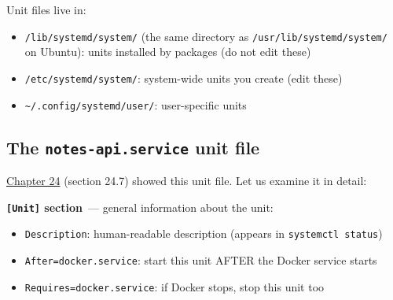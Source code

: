 \noindent{}Unit files live in:

\begin{itemize}
\tightlist
\item
  \texttt{/}\allowbreak{}\texttt{lib/}\allowbreak{}\texttt{systemd/}\allowbreak{}\texttt{system/} (the same directory as \texttt{/}\allowbreak{}\texttt{usr/}\allowbreak{}\texttt{lib/}\allowbreak{}\texttt{systemd/}\allowbreak{}\texttt{system/} on Ubuntu): units installed by packages (do not edit these)
\item
  \texttt{/}\allowbreak{}\texttt{etc/}\allowbreak{}\texttt{systemd/}\allowbreak{}\texttt{system/}: system-wide units you create (edit these)
\item
  \texttt{\textasciitilde{}/}\allowbreak{}\texttt{.config/}\allowbreak{}\texttt{systemd/}\allowbreak{}\texttt{user/}: user-specific units
\end{itemize}

\subsection*{\texorpdfstring{The \texttt{notes-api.service} unit file}{The notes-api.service unit file}}\label{25-process-management:the-notes-apiservice-unit-file}

\hyperref[ch:24-process-startup]{Chapter 24} (section 24.7) showed this unit file. Let us examine it in detail:

\begin{codebox}[short]

\begin{Shaded}
\begin{Highlighting}[]
\KeywordTok{[Unit]}
\OtherTok{=}
\OtherTok{=}
\OtherTok{=}
\OtherTok{=}
\end{Highlighting}
\end{Shaded}

\end{codebox}

\noindent{}\textbf{\texttt{{[}Unit{]}} section}~--- general information about the unit:

\begin{itemize}
\tightlist
\item
  \texttt{Description}: human-readable description (appears in \texttt{systemctl\ status})
\item
  \texttt{After=}\allowbreak{}\texttt{docker.service}: start this unit AFTER the Docker service starts
\item
  \texttt{Requires=}\allowbreak{}\texttt{docker.service}: if Docker stops, stop this unit too
\end{itemize}

